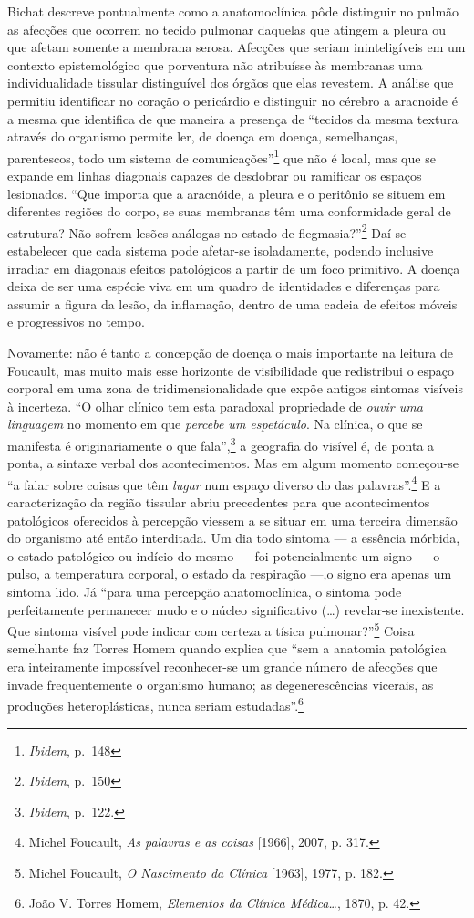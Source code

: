Bichat descreve pontualmente como a anatomoclínica pôde distinguir no
pulmão as afecções que ocorrem no tecido pulmonar daquelas que atingem a
pleura ou que afetam somente a membrana serosa. Afecções que seriam
ininteligíveis em um contexto epistemológico que porventura não
atribuísse às membranas uma individualidade tissular distinguível dos
órgãos que elas revestem. A análise que permitiu identificar no coração
o pericárdio e distinguir no cérebro a aracnoide é a mesma que
identifica de que maneira a presença de ``tecidos da mesma textura
através do organismo permite ler, de doença em doença, semelhanças,
parentescos, todo um sistema de comunicações''\footnote{\textit{Ibidem},
  p.~148} que não é local, mas que se expande em linhas diagonais
capazes de desdobrar ou ramificar os espaços lesionados. ``Que importa
que a aracnóide, a pleura e o peritônio se situem em diferentes regiões
do corpo, se suas membranas têm uma conformidade geral de estrutura? Não
sofrem lesões análogas no estado de flegmasia?''\footnote{\textit{Ibidem},
  p.~150} Daí se estabelecer que cada sistema pode afetar-se
isoladamente, podendo inclusive irradiar em diagonais efeitos
patológicos a partir de um foco primitivo. A doença deixa de ser uma
espécie viva em um quadro de identidades e diferenças para assumir a
figura da lesão, da inflamação, dentro de uma cadeia de efeitos móveis e
progressivos no tempo.

Novamente: não é tanto a concepção de doença o mais importante na
leitura de Foucault, mas muito mais esse horizonte de visibilidade que
redistribui o espaço corporal em uma zona de tridimensionalidade que
expõe antigos sintomas visíveis à incerteza. ``O olhar clínico tem esta
paradoxal propriedade de \textit{ouvir uma linguagem} no momento em que
\textit{percebe um espetáculo}. Na clínica, o que se manifesta é
originariamente o que fala'',\footnote{\textit{Ibidem}, p.~122.} a
geografia do visível é, de ponta a ponta, a sintaxe verbal dos
acontecimentos. Mas em algum momento começou-se ``a falar sobre coisas
que têm \textit{lugar} num espaço diverso do das palavras''.\footnote{Michel
  Foucault, \textit{As palavras e as coisas} {[}1966{]}, 2007, p. 317.} E
a caracterização da região tissular abriu precedentes para que
acontecimentos patológicos oferecidos à percepção viessem a se situar em
uma terceira dimensão do organismo até então interditada. Um dia todo
sintoma --- a essência mórbida, o estado patológico ou indício do mesmo
--- foi potencialmente um signo --- o pulso, a temperatura corporal, o
estado da respiração ---,o signo era apenas um sintoma lido. Já ``para
uma percepção anatomoclínica, o sintoma pode perfeitamente permanecer
mudo e o núcleo significativo (\dots{}) revelar-se inexistente. Que sintoma
visível pode indicar com certeza a tísica pulmonar?''\footnote{Michel
  Foucault, \textit{O Nascimento da Clínica} {[}1963{]}, 1977, p. 182.}
Coisa semelhante faz Torres Homem quando explica que ``sem a anatomia
patológica era inteiramente impossível reconhecer-se um grande número de
afecções que invade frequentemente o organismo humano; as
degenerescências vicerais, as produções heteroplásticas, nunca seriam
estudadas''.\footnote{João V. Torres Homem, \textit{Elementos da Clínica
  Médica\ldots{}}, 1870, p. 42.}

